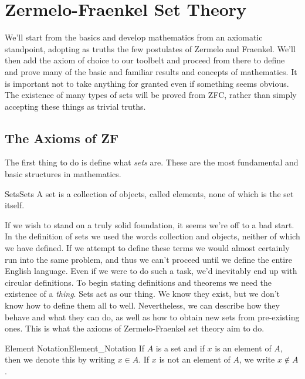 \chapter{Zermelo-Fraenkel Set Theory}
    We'll start from the basics and develop mathematics from an axiomatic
    standpoint, adopting as truths the few postulates of Zermelo and
    Fraenkel. We'll then add the axiom of choice to our toolbelt and
    proceed from there to define and prove many of the basic and familiar
    results and concepts of mathematics. It is important not to take anything
    for granted even if something seems obvious. The existence of many types
    of sets will be proved from ZFC, rather than simply accepting these
    things as trivial truths.
    \section{The Axioms of ZF}
        The first thing to do is define what \textit{sets} are. These are the
        most fundamental and basic structures in mathematics.
        \begin{fdefinition}{Sets}{Sets}
            A set is a collection of objects, called elements,
            none of which is the set itself.
        \end{fdefinition}
        If we wish to stand on a truly solid foundation, it seems we're off
        to a bad start. In the definition of sets we used the words
        \textrm{collection} and \textrm{objects}, neither of which we have
        defined. If we attempt to define these terms we would almost certainly
        run into the same problem, and thus we can't proceed until we define
        the entire English language. Even if we were to do such a task, we'd
        inevitably end up with circular definitions. To begin stating
        definitions and theorems we need the existence of a \textit{thing}.
        Sets act as our thing. We know they exist, but we don't know how to
        define them all to well. Nevertheless, we can describe how they behave
        and what they can do, as well as how to obtain new sets from
        pre-existing ones. This is what the axioms of Zermelo-Fraenkel set
        theory aim to do.
        \begin{fnotation}{Element Notation}{Element_Notation}
            If $A$ is a set and if $x$ is an element of $A$, then we
            denote this by writing $x\in{A}$. If $x$ is not an element of
            $A$, we write $x\notin{A}$.
        \end{fnotation}
